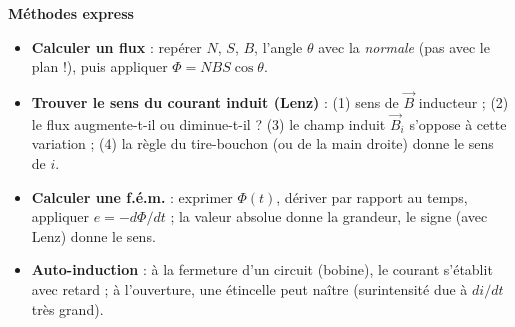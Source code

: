 \documentclass[11pt]{article}
\begin{document}
\begin{bilan}
\textbf{Méthodes express}
\begin{itemize}
  \item \textbf{Calculer un flux} : repérer $N$, $S$, $B$, l'angle $\theta$ avec la \emph{normale} (pas avec le plan !), puis appliquer $\Phi = NBS\cos\theta$.
  \item \textbf{Trouver le sens du courant induit (Lenz)} : (1) sens de $\vec{B}$ inducteur ; (2) le flux augmente-t-il ou diminue-t-il ? (3) le champ induit $\vec{B}_i$ s'oppose à cette variation ; (4) la règle du tire-bouchon (ou de la main droite) donne le sens de $i$.
  \item \textbf{Calculer une f.é.m.} : exprimer $\Phi(t)$, dériver par rapport au temps, appliquer $e = -d\Phi/dt$ ; la valeur absolue donne la grandeur, le signe (avec Lenz) donne le sens.
  \item \textbf{Auto-induction} : à la fermeture d'un circuit (bobine), le courant s'établit avec retard ; à l'ouverture, une étincelle peut naître (surintensité due à $di/dt$ très grand).
\end{itemize}
\end{bilan}
\end{document}
